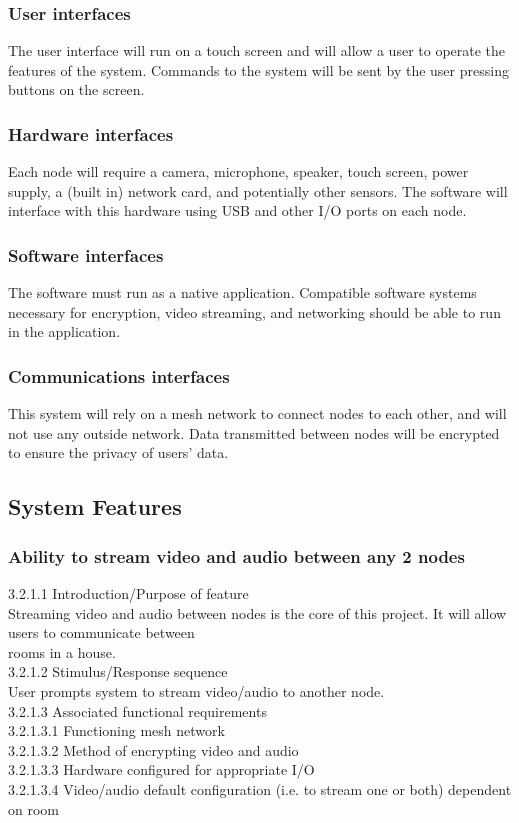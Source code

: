 \documentclass[onecolumn, draftclsnofoot,10pt, compsoc]{IEEEtran}
\newcommand\tab[1][1cm]{\hspace*{#1}}
\begin{document}
\subsubsection{User interfaces}
The user interface will run on a touch screen and will allow a user to operate the features of the system. Commands to the system will be sent by the user pressing buttons on the screen.

\subsubsection{Hardware interfaces}
Each node will require a camera, microphone, speaker, touch screen, power supply, a (built in) network card, and potentially other sensors. The software will interface with this hardware using USB and other I/O ports on each node. 

\subsubsection{Software interfaces}
The software must run as a native application. Compatible software systems necessary for encryption, video streaming, and networking should be able to run in the application. 

\subsubsection{Communications interfaces}
This system will rely on a mesh network to connect nodes to each other, and will not use any outside network. Data transmitted between nodes will be encrypted to ensure the privacy of users’ data. 

\subsection{System Features}

\subsubsection{Ability to stream video and audio between any 2 nodes}
\tab 3.2.1.1  Introduction/Purpose of feature \\
\tab Streaming video and audio between nodes is the core of this project. It will allow users to communicate between \\ \tab rooms in a house. \\ 
\tab 3.2.1.2  Stimulus/Response sequence \\
\tab User prompts system to stream video/audio to another node. \\ 
\tab 3.2.1.3  Associated functional requirements \\
\tab \tab 3.2.1.3.1  Functioning mesh network \\
\tab \tab 3.2.1.3.2  Method of encrypting video and audio \\
\tab \tab 3.2.1.3.3  Hardware configured for appropriate I/O \\
\tab \tab 3.2.1.3.4  Video/audio default configuration (i.e. to stream one or both) dependent on room
\end{document}
